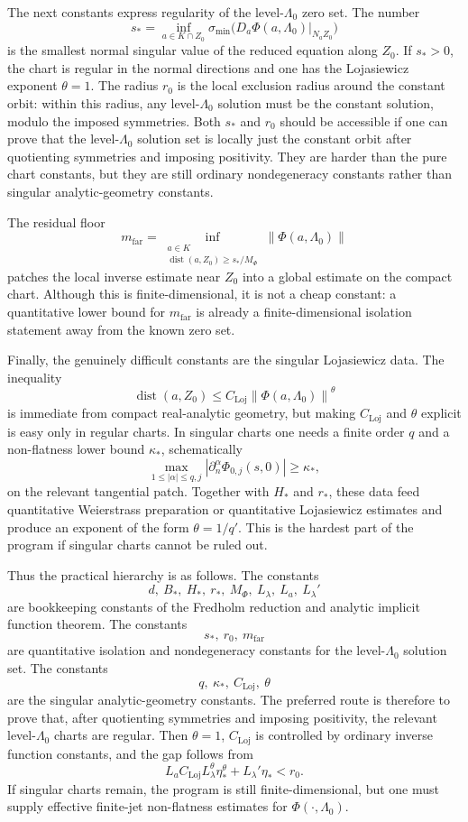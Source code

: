 \documentclass[12pt]{article}
\theoremstyle{definition}
\theoremstyle{remark}
\newcommand{\norm}[1]{\left\|#1\right\|}
\begin{document}
The next constants express regularity of the level-\(\Lambda_0\) zero
set.  The number
\[
  s_*=
  \inf_{a\in K\cap Z_0}
  \sigma_{\min}
  \bigl(D_a\Phi(a,\Lambda_0)|_{N_aZ_0}\bigr)
\]
is the smallest normal singular value of the reduced equation along
\(Z_0\).  If \(s_*>0\), the chart is regular in the normal directions and
one has the Lojasiewicz exponent \(\theta=1\).  The radius \(r_0\) is the
local exclusion radius around the constant orbit: within this radius,
any level-\(\Lambda_0\) solution must be the constant solution, modulo
the imposed symmetries.  Both \(s_*\) and \(r_0\) should be accessible if
one can prove that the level-\(\Lambda_0\) solution set is locally just
the constant orbit after quotienting symmetries and imposing positivity.
They are harder than the pure chart constants, but they are still
ordinary nondegeneracy constants rather than singular analytic-geometry
constants.

The residual floor
\[
  m_{\mathrm{far}}
  =
  \inf_{\substack{a\in K\\
  \operatorname{dist}(a,Z_0)\geq s_*/M_\Phi}}
  \norm{\Phi(a,\Lambda_0)}
\]
patches the local inverse estimate near \(Z_0\) into a global estimate on
the compact chart.  Although this is finite-dimensional, it is not a
cheap constant: a quantitative lower bound for \(m_{\mathrm{far}}\) is
already a finite-dimensional isolation statement away from the known
zero set.

Finally, the genuinely difficult constants are the singular
Lojasiewicz data.  The inequality
\[
  \operatorname{dist}(a,Z_0)
  \leq C_{\mathrm{Loj}}\norm{\Phi(a,\Lambda_0)}^\theta
\]
is immediate from compact real-analytic geometry, but making
\(C_{\mathrm{Loj}}\) and \(\theta\) explicit is easy only in regular
charts.  In singular charts one needs a finite order \(q\) and a
non-flatness lower bound \(\kappa_*\), schematically
\[
  \max_{1\leq|\alpha|\leq q,j}
  |\partial_n^\alpha\Phi_{0,j}(s,0)|
  \geq \kappa_*,
\]
on the relevant tangential patch.  Together with \(H_*\) and \(r_*\),
these data feed quantitative Weierstrass preparation or quantitative
Lojasiewicz estimates and produce an exponent of the form
\(\theta=1/q'\).  This is the hardest part of the program if singular
charts cannot be ruled out.

Thus the practical hierarchy is as follows.  The constants
\[
  d,\ B_*,\ H_*,\ r_*,\ M_\Phi,\ L_\lambda,\ L_a,\ L_\lambda'
\]
are bookkeeping constants of the Fredholm reduction and analytic
implicit function theorem.  The constants
\[
  s_*,\ r_0,\ m_{\mathrm{far}}
\]
are quantitative isolation and nondegeneracy constants for the
level-\(\Lambda_0\) solution set.  The constants
\[
  q,\ \kappa_*,\ C_{\mathrm{Loj}},\ \theta
\]
are the singular analytic-geometry constants.  The preferred route is
therefore to prove that, after quotienting symmetries and imposing
positivity, the relevant level-\(\Lambda_0\) charts are regular.  Then
\(\theta=1\), \(C_{\mathrm{Loj}}\) is controlled by ordinary inverse
function constants, and the gap follows from
\[
  L_a C_{\mathrm{Loj}}L_\lambda^\theta\eta_*^\theta
  +L_\lambda'\eta_*<r_0.
\]
If singular charts remain, the program is still finite-dimensional, but
one must supply effective finite-jet non-flatness estimates for
\(\Phi(\cdot,\Lambda_0)\).
\end{document}
